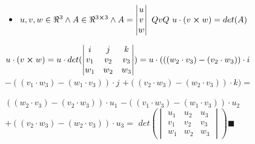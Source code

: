 \documentclass[../practica_01.tex]{subfiles}
\begin{document}
    \begin{itemize}
        \item $u, v, w \in \real^3 \wedge A \in \real^{3\cross3} \wedge A = \begin{vmatrix}
            u \\
            v \\
            w
        \end{vmatrix}\ QvQ\ u\cdot(v \crossproduct w) = det(A) $
    \end{itemize}

    $u \cdot (v \crossproduct w) = u \cdot det(\begin{vmatrix}
        i   & j   & k   \\
        v_1 & v_2 & v_3 \\
        w_1 & w_2 & w_3
    \end{vmatrix}) = u \cdot (((w_2 \cdot v_3) - (v_2 \cdot w_3)) \cdot i $
        $ - ((v_1 \cdot w_3) - (w_1 \cdot v_3)) \cdot j$
        $ + ((v_2 \cdot w_3) - (w_2 \cdot v_3)) \cdot k) = $

        $ ((w_2 \cdot v_3) - (v_2 \cdot w_3)) \cdot u_1 $
        $ - ((v_1 \cdot w_3) - (w_1 \cdot v_3)) \cdot u_2 $
        $ + ((v_2 \cdot w_3) - (w_2 \cdot v_3)) \cdot u_3 = $
        $det(\begin{vmatrix}
            u_1 & u_2 & u_3 \\
            v_1 & v_2 & v_3 \\
            w_1 & w_2 & w_3
        \end{vmatrix}) \blacksquare$
\end{document}
